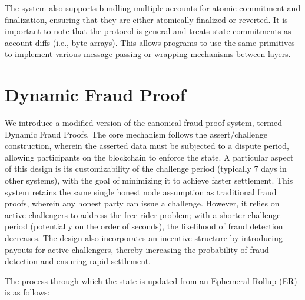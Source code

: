 \documentclass{article}
\begin{document}
The system also supports bundling multiple accounts for atomic commitment and finalization, ensuring that they are either atomically finalized or reverted. It is important to note that the protocol is general and treats state commitments as account diffs (i.e., byte arrays). This allows programs to use the same primitives to implement various message-passing or wrapping mechanisms between layers.

\section{Dynamic Fraud Proof}
\label{sec:fraud_proof}

We introduce a modified version of the canonical fraud proof system, termed Dynamic Fraud Proofs. The core mechanism follows the assert/challenge construction, wherein the asserted data must be subjected to a dispute period, allowing participants on the blockchain to enforce the state. A particular aspect of this design is its customizability of the challenge period (typically 7 days in other systems), with the goal of minimizing it to achieve faster settlement. This system retains the same single honest node assumption as traditional fraud proofs, wherein any honest party can issue a challenge. However, it relies on active challengers to address the free-rider problem; with a shorter challenge period (potentially on the order of seconds), the likelihood of fraud detection decreases. The design also incorporates an incentive structure by introducing payouts for active challengers, thereby increasing the probability of fraud detection and ensuring rapid settlement.

The process through which the state is updated from an Ephemeral Rollup (ER) is as follows:
\end{document}
